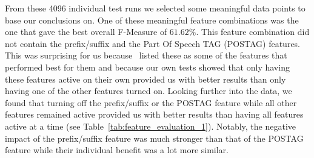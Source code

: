 From these 4096 individual test runs we selected some meaningful data points to base our conclusions on.
One of these meaningful feature combinations was the one that gave the best overall F-Measure of $61.62\%$.
This feature combination did not contain the prefix/suffix and the Part Of Speech TAG (POSTAG) features.
This was surprising for us because~\cite{madigan2005author} listed these as some of the features that performed best for them and because our own tests showed that only having these features active on their own provided us with better results than only having one of the other features turned on.
Looking further into the data, we found that turning off the prefix/suffix or the POSTAG feature while all other features remained active provided us with better results than having all features active at a time (see Table~\ref{tab:feature_evaluation_1}).
Notably, the negative impact of the prefix/suffix feature was much stronger than that of the POSTAG feature while their individual benefit was a lot more similar.

